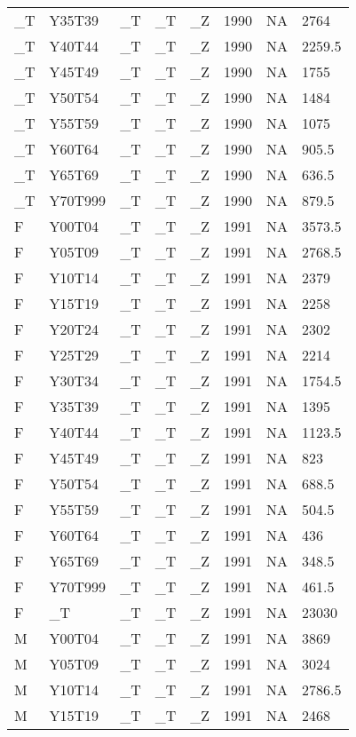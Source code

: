 \begin{longtable}[t]{llllllll}
\_T & Y35T39 & \_T & \_T & \_Z & 1990 & NA & 2764\\
\_T & Y40T44 & \_T & \_T & \_Z & 1990 & NA & 2259.5\\
\_T & Y45T49 & \_T & \_T & \_Z & 1990 & NA & 1755\\
\addlinespace
\_T & Y50T54 & \_T & \_T & \_Z & 1990 & NA & 1484\\
\_T & Y55T59 & \_T & \_T & \_Z & 1990 & NA & 1075\\
\_T & Y60T64 & \_T & \_T & \_Z & 1990 & NA & 905.5\\
\_T & Y65T69 & \_T & \_T & \_Z & 1990 & NA & 636.5\\
\_T & Y70T999 & \_T & \_T & \_Z & 1990 & NA & 879.5\\
\addlinespace
F & Y00T04 & \_T & \_T & \_Z & 1991 & NA & 3573.5\\
F & Y05T09 & \_T & \_T & \_Z & 1991 & NA & 2768.5\\
F & Y10T14 & \_T & \_T & \_Z & 1991 & NA & 2379\\
F & Y15T19 & \_T & \_T & \_Z & 1991 & NA & 2258\\
F & Y20T24 & \_T & \_T & \_Z & 1991 & NA & 2302\\
\addlinespace
F & Y25T29 & \_T & \_T & \_Z & 1991 & NA & 2214\\
F & Y30T34 & \_T & \_T & \_Z & 1991 & NA & 1754.5\\
F & Y35T39 & \_T & \_T & \_Z & 1991 & NA & 1395\\
F & Y40T44 & \_T & \_T & \_Z & 1991 & NA & 1123.5\\
F & Y45T49 & \_T & \_T & \_Z & 1991 & NA & 823\\
\addlinespace
F & Y50T54 & \_T & \_T & \_Z & 1991 & NA & 688.5\\
F & Y55T59 & \_T & \_T & \_Z & 1991 & NA & 504.5\\
F & Y60T64 & \_T & \_T & \_Z & 1991 & NA & 436\\
F & Y65T69 & \_T & \_T & \_Z & 1991 & NA & 348.5\\
F & Y70T999 & \_T & \_T & \_Z & 1991 & NA & 461.5\\
\addlinespace
F & \_T & \_T & \_T & \_Z & 1991 & NA & 23030\\
M & Y00T04 & \_T & \_T & \_Z & 1991 & NA & 3869\\
M & Y05T09 & \_T & \_T & \_Z & 1991 & NA & 3024\\
M & Y10T14 & \_T & \_T & \_Z & 1991 & NA & 2786.5\\
M & Y15T19 & \_T & \_T & \_Z & 1991 & NA & 2468\\

\end{longtable}

